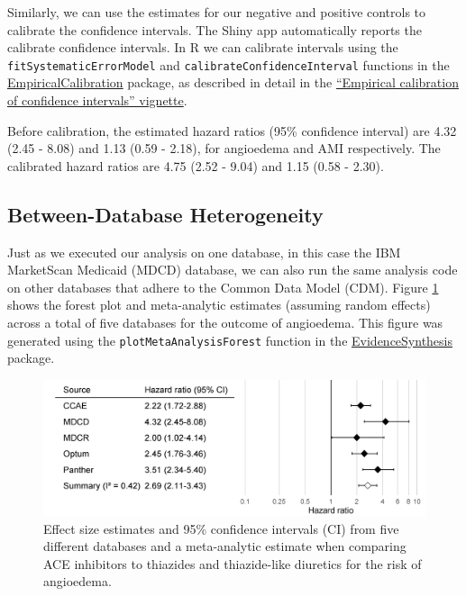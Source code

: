 \documentclass[11pt]{book}
\theoremstyle{definition}
\theoremstyle{definition}
\theoremstyle{definition}
\theoremstyle{remark}
\begin{document}
Similarly, we can use the estimates for our negative and positive
controls to calibrate the confidence intervals. The Shiny app
automatically reports the calibrate confidence intervals. In R we can
calibrate intervals using the \texttt{fitSystematicErrorModel} and
\texttt{calibrateConfidenceInterval} functions in the
\href{https://ohdsi.github.io/EmpiricalCalibration/}{EmpiricalCalibration}
package, as described in detail in the
\href{https://ohdsi.github.io/EmpiricalCalibration/articles/EmpiricalCiCalibrationVignette.html}{``Empirical
calibration of confidence intervals'' vignette}.

Before calibration, the estimated hazard ratios (95\% confidence
interval) are 4.32 (2.45 - 8.08) and 1.13 (0.59 - 2.18), for angioedema
and AMI respectively. The calibrated hazard ratios are 4.75 (2.52 -
9.04) and 1.15 (0.58 - 2.30).

\subsection{Between-Database
Heterogeneity}\label{between-database-heterogeneity}

Just as we executed our analysis on one database, in this case the IBM
MarketScan Medicaid (MDCD) database, we can also run the same analysis
code on other databases that adhere to the Common Data Model (CDM).
Figure \ref{fig:forest} shows the forest plot and meta-analytic
estimates (assuming random effects) \citep{dersimonian_1986} across a
total of five databases for the outcome of angioedema. This figure was
generated using the \texttt{plotMetaAnalysisForest} function in the
\href{https://ohdsi.github.io/EvidenceSynthesis/}{EvidenceSynthesis}
package.

\begin{figure}

{\centering \includegraphics[width=0.9\linewidth]{images/MethodValidity/forest} 

}

\caption{Effect size estimates and 95\% confidence intervals (CI) from five different databases and a meta-analytic estimate when comparing ACE inhibitors to thiazides and thiazide-like diuretics for the risk of angioedema.}\label{fig:forest}
\end{figure}
\end{document}

